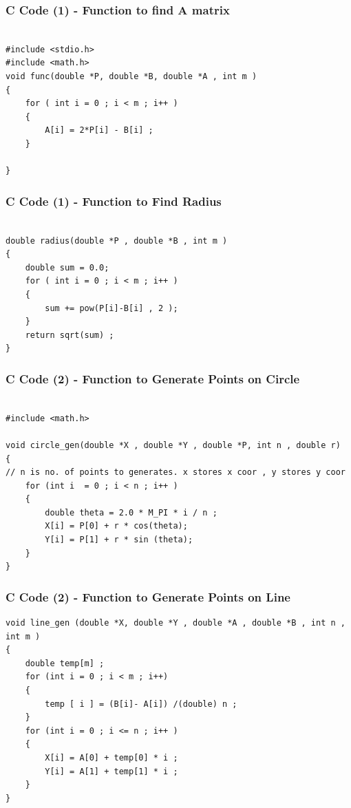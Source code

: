\documentclass{beamer}
\begin{document}
\begin{frame}[fragile]
    \frametitle{C Code (1) - Function to find A matrix }

    \begin{lstlisting}

#include <stdio.h>
#include <math.h>
void func(double *P, double *B, double *A , int m )
{
    for ( int i = 0 ; i < m ; i++ )
    {
        A[i] = 2*P[i] - B[i] ; 
    }

}
    \end{lstlisting}
\end{frame}
\begin{frame}[fragile]
    \frametitle{C Code (1) - Function to Find Radius}

    \begin{lstlisting}

double radius(double *P , double *B , int m )
{
    double sum = 0.0; 
    for ( int i = 0 ; i < m ; i++ )
    {
        sum += pow(P[i]-B[i] , 2 );
    }
    return sqrt(sum) ; 
}

    \end{lstlisting}
\end{frame}


\begin{frame}[fragile]
    \frametitle{C Code (2) - Function to Generate Points on Circle}

    \begin{lstlisting}

#include <math.h>

void circle_gen(double *X , double *Y , double *P, int n , double r)
{
// n is no. of points to generates. x stores x coor , y stores y coor 
    for (int i  = 0 ; i < n ; i++ )
    {
        double theta = 2.0 * M_PI * i / n ; 
        X[i] = P[0] + r * cos(theta);
        Y[i] = P[1] + r * sin (theta); 
    }   
}
    \end{lstlisting}
\end{frame}
\begin{frame}[fragile]
    \frametitle{C Code (2) - Function to Generate Points on Line}

    \begin{lstlisting}
void line_gen (double *X, double *Y , double *A , double *B , int n , int m )
{
    double temp[m] ; 
    for (int i = 0 ; i < m ; i++)
    {
        temp [ i ] = (B[i]- A[i]) /(double) n ; 
    }
    for (int i = 0 ; i <= n ; i++ )
    {
        X[i] = A[0] + temp[0] * i ; 
        Y[i] = A[1] + temp[1] * i ;
    }
}



    \end{lstlisting}
\end{frame}
\end{document}
